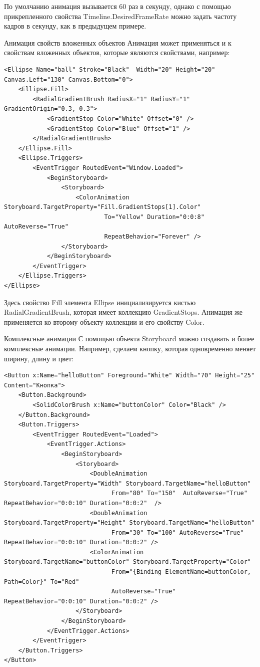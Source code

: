 По умолчанию анимация вызывается 60 раз в секунду, однако с помощью прикрепленного свойства Timeline.DesiredFrameRate можно задать частоту кадров в секунду, как в предыдущем примере.

Анимация свойств вложенных объектов
Анимация может применяться и к свойствам вложенных объектов, которые являются свойствами, например:

\begin{verbatim}
<Ellipse Name="ball" Stroke="Black"  Width="20" Height="20" Canvas.Left="130" Canvas.Bottom="0">
    <Ellipse.Fill>
        <RadialGradientBrush RadiusX="1" RadiusY="1" GradientOrigin="0.3, 0.3">
            <GradientStop Color="White" Offset="0" />
            <GradientStop Color="Blue" Offset="1" />
        </RadialGradientBrush>
    </Ellipse.Fill>
    <Ellipse.Triggers>
        <EventTrigger RoutedEvent="Window.Loaded">
            <BeginStoryboard>
                <Storyboard>
                    <ColorAnimation Storyboard.TargetProperty="Fill.GradientStops[1].Color"
                            To="Yellow" Duration="0:0:8" AutoReverse="True"
                            RepeatBehavior="Forever" />
                </Storyboard>
            </BeginStoryboard>
        </EventTrigger>
    </Ellipse.Triggers>
</Ellipse>
\end{verbatim}

Здесь свойство Fill элемента Ellipse инициализируется кистью RadialGradientBrush, которая имеет коллекцию GradientStops. Анимация же применяется ко второму объекту коллекции и его свойству Color.

Комплексные анимации
С помощью объекта Storyboard можно создавать и более комплексные анимации. Например, сделаем кнопку, которая одновременно меняет ширину, длину и цвет:

\begin{verbatim}
<Button x:Name="helloButton" Foreground="White" Width="70" Height="25" Content="Кнопка">
    <Button.Background>
        <SolidColorBrush x:Name="buttonColor" Color="Black" />
    </Button.Background>
    <Button.Triggers>
        <EventTrigger RoutedEvent="Loaded">
            <EventTrigger.Actions>
                <BeginStoryboard>
                    <Storyboard>
                        <DoubleAnimation Storyboard.TargetProperty="Width" Storyboard.TargetName="helloButton"
                              From="80" To="150"  AutoReverse="True" RepeatBehavior="0:0:10" Duration="0:0:2"  />
                        <DoubleAnimation Storyboard.TargetProperty="Height" Storyboard.TargetName="helloButton"
                              From="30" To="100" AutoReverse="True" RepeatBehavior="0:0:10" Duration="0:0:2" />
                        <ColorAnimation Storyboard.TargetName="buttonColor" Storyboard.TargetProperty="Color"
                              From="{Binding ElementName=buttonColor, Path=Color}" To="Red"
                              AutoReverse="True" RepeatBehavior="0:0:10" Duration="0:0:2" />
                    </Storyboard>
                </BeginStoryboard>
            </EventTrigger.Actions>
        </EventTrigger>
    </Button.Triggers>
</Button>
\end{verbatim}

